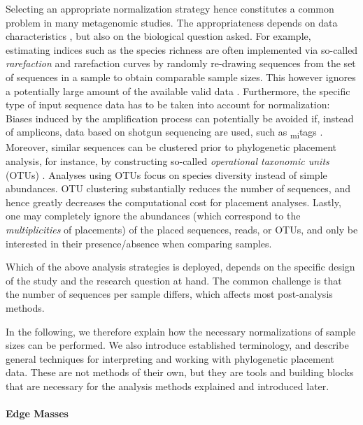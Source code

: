 Selecting an appropriate normalization strategy hence constitutes a common problem in many metagenomic studies.
The appropriateness depends on data characteristics \cite{Weiss2017}, but also on the biological question asked.
For example, estimating indices such as the species richness are often implemented
via so-called \emph{rarefaction} and rarefaction curves \cite{Gotelli2001}
by randomly re-drawing sequences from the set of sequences in a sample to obtain comparable sample sizes.
This however ignores a potentially large amount of the available valid data \cite{McMurdie2014}.
Furthermore, the specific type of input sequence data has to be taken into account for normalization:
Biases induced by the amplification process can potentially be avoided if, instead of amplicons,
data based on shotgun sequencing are used, such as \textsubscript{mi}tags \cite{Logares2014}.
Moreover, similar sequences can be clustered prior to phylogenetic placement analysis, for instance,
by constructing so-called \emph{operational taxonomic units} (OTUs) \cite{Edgar2010,Mahe2014,Mahe2015,Rognes2016}.
Analyses using OTUs focus on species diversity instead of simple abundances.
OTU clustering substantially reduces the number of sequences,
and hence greatly decreases the computational cost for placement analyses.
Lastly, one may completely ignore the abundances (which correspond to the \emph{multiplicities} of placements)
of the placed sequences, reads, or OTUs, and only be interested in their presence/absence when comparing samples.

Which of the above analysis strategies is deployed,
depends on the specific design of the study and the research question at hand.
The common challenge is that the number of sequences per sample differs, which affects most post-analysis methods.

In the following, we therefore explain how the necessary normalizations of sample sizes can be performed.
We also introduce established terminology,
and describe general techniques for interpreting and working with phylogenetic placement data.
These are not methods of their own, but they are tools and building blocks
that are necessary for the analysis methods explained and introduced later.

\paragraph{Edge Masses}
\label{ch:Foundations:sec:PhylogeneticPlacement:sub:PlacementProcessing:par:EdgeMasses}

